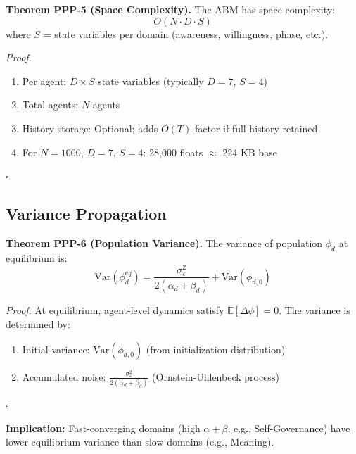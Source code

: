 \begin{tcolorbox}[colback=yellow!5!white, colframe=yellow!75!black, title=Theorem PPP-5: Space Complexity]
\textbf{Theorem PPP-5 (Space Complexity).}
The ABM has space complexity:
\begin{equation}
O(N \cdot D \cdot S)
\end{equation}
where $S$ = state variables per domain (awareness, willingness, phase, etc.).

\textit{Proof.}
\begin{enumerate}[nosep]
\item Per agent: $D \times S$ state variables (typically $D = 7$, $S = 4$)
\item Total agents: $N$ agents
\item History storage: Optional; adds $O(T)$ factor if full history retained
\item For $N = 1000$, $D = 7$, $S = 4$: 28,000 floats $\approx$ 224 KB base
\end{enumerate}
\hfill $\square$
\end{tcolorbox}

\subsection{Variance Propagation}

\begin{tcolorbox}[colback=green!5!white, colframe=green!75!black, title=Theorem PPP-6: Variance Propagation]
\textbf{Theorem PPP-6 (Population Variance).}
The variance of population $\phi_d$ at equilibrium is:
\begin{equation}
\text{Var}(\phi^{eq}_d) = \frac{\sigma^2_\varepsilon}{2(\alpha_d + \beta_d)} + \text{Var}(\phi_{d,0})
\label{eq:ppp-variance}
\end{equation}

\textit{Proof.}
At equilibrium, agent-level dynamics satisfy $\mathbb{E}[\Delta\phi] = 0$.
The variance is determined by:
\begin{enumerate}[nosep]
\item Initial variance: $\text{Var}(\phi_{d,0})$ (from initialization distribution)
\item Accumulated noise: $\frac{\sigma^2_\varepsilon}{2(\alpha_d + \beta_d)}$ (Ornstein-Uhlenbeck process)
\end{enumerate}
\hfill $\square$
\end{tcolorbox}

\textbf{Implication:} Fast-converging domains (high $\alpha + \beta$, e.g., Self-Governance) have
lower equilibrium variance than slow domains (e.g., Meaning).

